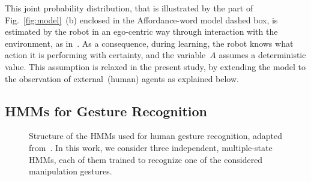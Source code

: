 This joint probability distribution, that is illustrated by the part of Fig.~\ref{fig:model}~(b) enclosed in the Affordance-word model dashed box, is estimated by the robot in an ego-centric way through interaction with the environment, as in~\cite{salvi:2012:smcb}. As a consequence, during learning, the robot knows what action it is performing with certainty, and the variable~$A$ assumes a deterministic value. This assumption is relaxed in the present study, by extending the model to the observation of external~(human) agents as explained below.

\subsection{\aclp{HMM} for Gesture Recognition}

\newcommand{\myscalefactor}{0.8}

\newcommand{\standardhmm}[1]{
    \node[draw,circle] (hmm#1s1) {$s_1$};
    \node[draw,circle, right of=hmm#1s1] (hmm#1s2) {$s_2$};
    \node[circle, right of=hmm#1s2] (hmm#1s3) {\dots};
    \node[draw,circle, right of=hmm#1s3] (hmm#1s4) {$s_Q$};
    \node[left of=hmm#1s1]  (invisible1) {};
    \node[right of=hmm#1s4] (invisible2) {};
    \path[->] (hmm#1s1) edge (hmm#1s2);
    \path[loop above] (hmm#1s1) edge (hmm#1s1);
    \path[->] (hmm#1s2) edge (hmm#1s3);
    \path[loop above] (hmm#1s2) edge (hmm#1s2);
    \path[dashed] (hmm#1s2) -- (hmm#1s3);
    \path[->] (hmm#1s3) edge (hmm#1s4);
    \path[loop above] (hmm#1s4) edge (hmm#1s4);
    \path[->] (invisible1) edge (hmm#1s1);
    \path[->] (hmm#1s4) edge (invisible2);
}

\newcommand{\modeltwo}{
}

\begin{figure}
  \centering
  \modeltwo
  \caption{Structure of the \acp{HMM} used for human gesture recognition, adapted from~\cite{saponaro:2013:crhri}. In this work, we consider three independent, multiple-state \acp{HMM}, each of them trained to recognize one of the considered manipulation gestures.}
  \label{fig:hmms}
\end{figure}

